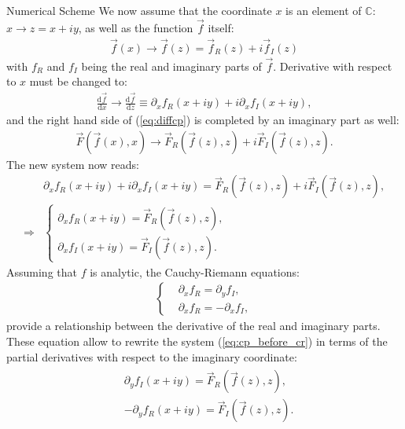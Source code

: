 \begin{section}{Numerical Scheme}
  We now assume that the coordinate $x$ is an element of $\mathbb{C}$:
  $x\to z=x+iy$, as well as the function $\vec f$ itself:
  \begin{align}
    \vec f(x)\to \vec f(z)=\vec f_{R}(z)+i\vec f_{I}(z)
  \end{align}
  with $f_{R}$ and $f_{I}$ being the real and imaginary parts of $\vec
  f$. Derivative with respect to $x$ must be changed to:
  \begin{align}
    \frac{\mathrm{d}\vec f}{\mathrm d x} \to \frac{\mathrm{d}\vec f}{\mathrm d z} \equiv \partial_x f_R(x+iy)+i\partial_x f_I(x+iy),
  \end{align}
  and the right hand side of (\ref{eq:diffcp}) is completed by an imaginary part as well:
  \begin{align}
    \vec F(\vec f(x),x) \to \vec F_R(\vec f(z),z)+i\vec F_I(\vec f(z),z).
  \end{align}
  The new system now reads:
  \begin{align}
    &\partial_x f_R(x+iy)+i\partial_x f_I(x+iy) = \vec F_R(\vec f(z),z)+i\vec F_I(\vec f(z),z),\\
    \Rightarrow &\left\{
    \begin{aligned}
      \partial_x f_R(x+iy) = \vec F_R(\vec f(z),z),\\
      \partial_x f_I(x+iy) = \vec F_I(\vec f(z),z).
    \end{aligned}
    \right.\label{eq:cp_before_cr}
  \end{align}
  Assuming that $f$ is analytic, the Cauchy-Riemann equations:
  \begin{align}\label{eq:cr}
    \left\{
    \begin{aligned}
      &\partial_x f_{R} = \partial_{y} f_{I},\\
      &\partial_x f_{R} = -\partial_{x} f_{I},
    \end{aligned}
    \right.
  \end{align}
  provide a relationship between the derivative of the real and
  imaginary parts.  These equation allow to rewrite the system
  (\ref{eq:cp_before_cr}) in terms of the partial derivatives with
  respect to the imaginary coordinate:
  \begin{align}
    \begin{aligned}
      &\partial_y f_I(x+iy) = \vec F_R(\vec f(z),z),\\
      &-\partial_y f_R(x+iy) = \vec F_I(\vec f(z),z).
    \end{aligned}\label{eq:cp}
  \end{align}
  

\end{section}

